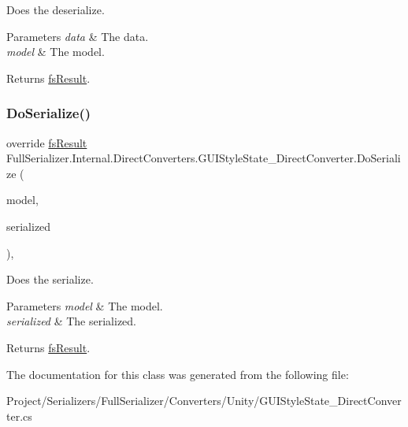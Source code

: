 Does the deserialize. 


\begin{DoxyParams}{Parameters}
{\em data} & The data.\\
\hline
{\em model} & The model.\\
\hline
\end{DoxyParams}
\begin{DoxyReturn}{Returns}
\hyperlink{struct_full_serializer_1_1fs_result}{fs\+Result}.
\end{DoxyReturn}
\mbox{\label{class_full_serializer_1_1_internal_1_1_direct_converters_1_1_g_u_i_style_state___direct_converter_a22918e9d8716303f0d7c311ded59182a}} 
\subsubsection{\texorpdfstring{Do\+Serialize()}{DoSerialize()}}
{\footnotesize\ttfamily override \hyperlink{struct_full_serializer_1_1fs_result}{fs\+Result} Full\+Serializer.\+Internal.\+Direct\+Converters.\+G\+U\+I\+Style\+State\+\_\+\+Direct\+Converter.\+Do\+Serialize (\begin{DoxyParamCaption}\item[{G\+U\+I\+Style\+State}]{model,  }\item[{Dictionary$<$ string, \hyperlink{class_full_serializer_1_1fs_data}{fs\+Data} $>$}]{serialized }\end{DoxyParamCaption})\hspace{0.3cm}{\ttfamily [inline]}, {\ttfamily [protected]}}



Does the serialize. 


\begin{DoxyParams}{Parameters}
{\em model} & The model.\\
\hline
{\em serialized} & The serialized.\\
\hline
\end{DoxyParams}
\begin{DoxyReturn}{Returns}
\hyperlink{struct_full_serializer_1_1fs_result}{fs\+Result}.
\end{DoxyReturn}


The documentation for this class was generated from the following file\+:\begin{DoxyCompactItemize}
\item 
Project/\+Serializers/\+Full\+Serializer/\+Converters/\+Unity/G\+U\+I\+Style\+State\+\_\+\+Direct\+Converter.\+cs\end{DoxyCompactItemize}
